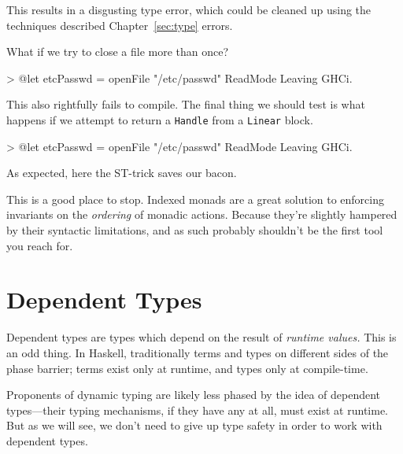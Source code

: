 \documentclass[
  11pt,
]{book}
\newenvironment{Shaded}{}{}
\newcommand{\DataTypeTok}[1]{\textcolor[rgb]{0.56,0.13,0.00}{#1}}
\newcommand{\NormalTok}[1]{#1}
\newcommand{\OperatorTok}[1]{\textcolor[rgb]{0.40,0.40,0.40}{#1}}
\newcommand{\OtherTok}[1]{\textcolor[rgb]{0.00,0.44,0.13}{#1}}
\newcommand{\StringTok}[1]{\textcolor[rgb]{0.25,0.44,0.63}{#1}}
\theoremstyle{nonumberplain}
\begin{document}
This results in a disgusting type error, which could be cleaned up using
the techniques described Chapter~\ref{sec:type} errors.

What if we try to close a file more than once?

\begin{Shaded}
\begin{Highlighting}[]
\OperatorTok{\textgreater{}} \OperatorTok{@}\NormalTok{let etcPasswd }\OtherTok{=}\NormalTok{ openFile }\StringTok{"/etc/passwd"} \DataTypeTok{ReadMode}
\DataTypeTok{Leaving} \DataTypeTok{GHCi}\OperatorTok{.}
\end{Highlighting}
\end{Shaded}

This also rightfully fails to compile. The final thing we should test is
what happens if we attempt to return a \texttt{Handle} from a
\texttt{Linear} block.

\begin{Shaded}
\begin{Highlighting}[]
\OperatorTok{\textgreater{}} \OperatorTok{@}\NormalTok{let etcPasswd }\OtherTok{=}\NormalTok{ openFile }\StringTok{"/etc/passwd"} \DataTypeTok{ReadMode}
\DataTypeTok{Leaving} \DataTypeTok{GHCi}\OperatorTok{.}
\end{Highlighting}
\end{Shaded}

As expected, here the ST-trick saves our bacon.

This is a good place to stop. Indexed monads are a great solution to
enforcing invariants on the \emph{ordering} of monadic actions. Because
they're slightly hampered by their syntactic limitations, and as such
probably shouldn't be the first tool you reach for.

\hypertarget{dependent-types}{%
\chapter{Dependent Types}\label{dependent-types}}

Dependent types are types which depend on the result of \emph{runtime
values.} This is an odd thing. In Haskell, traditionally terms and types
on different sides of the phase barrier; terms exist only at runtime,
and types only at compile-time.

Proponents of dynamic typing are likely less phased by the idea of
dependent types---their typing mechanisms, if they have any at all, must
exist at runtime. But as we will see, we don't need to give up type
safety in order to work with dependent types.
\end{document}
